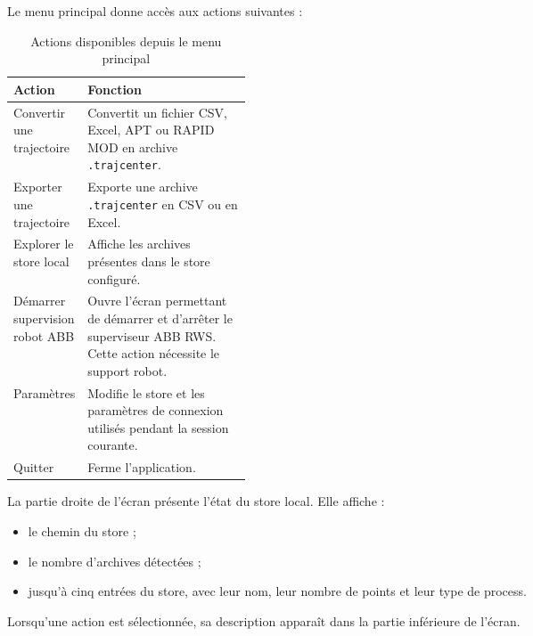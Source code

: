 \documentclass{rapportENSAM}
\begin{document}
Le menu principal donne accès aux actions suivantes :

\begin{table}[ht]
    \centering
    \begin{tabularx}{\linewidth}{
        |p{0.31\linewidth}
        |X|
    }
        \hline
        \textbf{Action} &
        \textbf{Fonction} \\
        \hline

        Convertir une trajectoire &
        Convertit un fichier CSV, Excel, APT ou RAPID MOD en archive
        \texttt{.trajcenter}. \\
        \hline

        Exporter une trajectoire &
        Exporte une archive \texttt{.trajcenter} en CSV ou en Excel. \\
        \hline

        Explorer le store local &
        Affiche les archives présentes dans le store configuré. \\
        \hline

        Démarrer supervision robot ABB &
        Ouvre l'écran permettant de démarrer et d'arrêter le superviseur
        ABB RWS. Cette action nécessite le support robot. \\
        \hline

        Paramètres &
        Modifie le store et les paramètres de connexion utilisés pendant la
        session courante. \\
        \hline

        Quitter &
        Ferme l'application. \\
        \hline
    \end{tabularx}
    \caption{Actions disponibles depuis le menu principal}
    \label{tab:pc-tui-home-actions}
\end{table}

La partie droite de l'écran présente l'état du store local. Elle affiche :

\begin{itemize}
    \item le chemin du store ;
    \item le nombre d'archives détectées ;
    \item jusqu'à cinq entrées du store, avec leur nom, leur nombre de points
    et leur type de process.
\end{itemize}

Lorsqu'une action est sélectionnée, sa description apparaît dans la partie
inférieure de l'écran.
\end{document}
